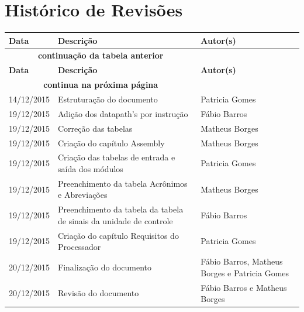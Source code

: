 \documentclass{report}
\begin{document}
\Organization{}

\capa
\newpage
\newpage

\section*{\center Histórico de Revisões}
\begin{center}
\begin{longtable}[pos]{|m{50pt} | m{200pt} | m{100pt}|} \hline
	\cellcolor[gray]{0.9} \textbf{Data} & \cellcolor[gray]{0.9}\textbf{Descrição} & \cellcolor[gray]{0.9}\textbf{Autor(s)}\\ \hline \endfirsthead \hline
	\multicolumn{2}{|c|}{{\bfseries \textbf{continuação da tabela anterior}}} \\ \hline
	\textbf{Data} & \cellcolor[gray]{0.9}\textbf{Descrição} & \cellcolor[gray]{0.9}\textbf{Autor(s)}\\ \hline
	\multicolumn{2}{|c|}{{\textbf{continua na próxima página}}} \\ \hline \endfoot
	\hline \endlastfoot
	
  14/12/2015 &  Estruturação do documento &  Patricia Gomes\\ \hline  
  19/12/2015 &  Adição dos datapath's por instrução &  Fábio Barros\\ \hline 
  19/12/2015 &  Correção das tabelas &  Matheus Borges\\ \hline 
  19/12/2015 &  Criação do capítulo Assembly & Matheus Borges\\ \hline 
  19/12/2015 &  Criação das tabelas de entrada e saída dos módulos &  Patricia Gomes\\ \hline 
  19/12/2015 &  Preenchimento da tabela Acrônimos e Abreviações &  Matheus Borges\\ \hline
  19/12/2015 &  Preenchimento da tabela da tabela de sinais da unidade de controle &  Fábio Barros\\ \hline 
  19/12/2015 &  Criação do capítulo Requisitos do Processador  & Patricia Gomes \\ \hline 
  20/12/2015 &  Finalização do documento & Fábio Barros, Matheus Borges e Patricia Gomes\\ \hline
  20/12/2015 &  Revisão do documento & Fábio Barros e Matheus Borges \\ \hline 
  

\end{longtable}
\end{center}
\newpage
\tableofcontents
\newpage
\end{document}
